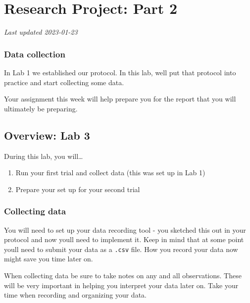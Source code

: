 \documentclass[
]{book}
\providecommand{\tightlist}{%
  \setlength{\itemsep}{0pt}\setlength{\parskip}{0pt}}
\begin{document}
\hypertarget{research-project-part-2}{%
\chapter*{Research Project: Part 2}\label{research-project-part-2}}

\emph{Last updated 2023-01-23}

\hypertarget{data-collection}{%
\subsection*{Data collection}\label{data-collection}}

In Lab 1 we established our protocol. In this lab, we\textquotesingle ll put that protocol into practice and start collecting some data.

Your assignment this week will help prepare you for the report that you will ultimately be preparing.

\hypertarget{overview-lab-3}{%
\section*{Overview: Lab 3}\label{overview-lab-3}}

During this lab, you will\ldots{}

\begin{enumerate}
\def\labelenumi{\arabic{enumi}.}
\tightlist
\item
  Run your first trial and collect data (this was set up in Lab 1)
\item
  Prepare your set up for your second trial
\end{enumerate}

\hypertarget{collecting-data}{%
\subsection*{Collecting data}\label{collecting-data}}

You will need to set up your data recording tool - you sketched this out in your protocol and now you\textquotesingle ll need to implement it. Keep in mind that at some point you\textquotesingle ll need to submit your data as a \texttt{.csv} file. How you record your data now might save you time later on.

When collecting data be sure to take notes on any and all observations. These will be very important in helping you interpret your data later on. Take your time when recording and organizing your data.
\end{document}
